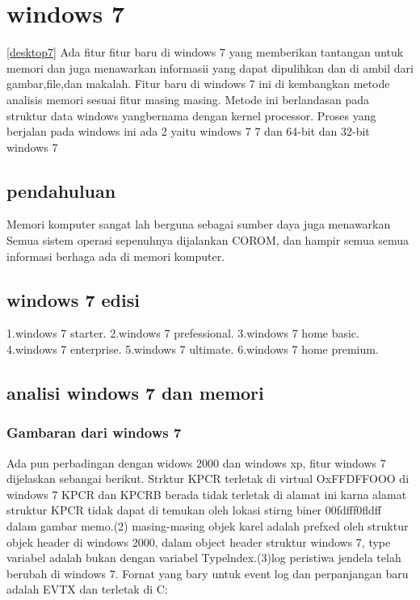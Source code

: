 	\section{windows 7}
\ref{desktop7}
		Ada fitur fitur baru di windows 7 yang memberikan tantangan untuk memori
		dan juga menawarkan informasii yang dapat dipulihkan dan di ambil dari
		gambar,file,dan makalah. Fitur baru di windows 7 ini di kembangkan 
		metode analisis memori sesuai fitur masing masing. Metode ini
		berlandasan pada struktur data windows yangbernama dengan kernel
		processor. Proses yang berjalan pada windows ini ada 2 yaitu windows 7 
		7 dan 64-bit dan 32-bit windows 7
		\subsection{pendahuluan}
			Memori komputer sangat lah berguna sebagai sumber daya juga menawarkan
			Semua sistem operasi sepenuhnya dijalankan COROM, dan hampir semua
			semua informasi berhaga ada di memori komputer.
		\subsection{windows 7 edisi}
			1.windows 7 starter.
			2.windows 7 prefessional.
			3.windows 7 home basic.
			4.windows 7 enterprise.
			5.windows 7 ultimate.
			6.windows 7 home premium.
		\subsection{analisi windows 7 dan memori}
			\subsubsection{Gambaran dari windows 7}
				Ada pun perbadingan dengan widows 2000 dan windows xp, fitur windows 7 
				dijelaskan sebangai berikut. Strktur KPCR terletak di virtual OxFFDFFOOO
				di windows 7 KPCR dan KPCRB berada tidak terletak di alamat ini karna
				alamat struktur KPCR tidak dapat di temukan oleh lokasi stirng biner 
				00fdfff0fldff dalam gambar memo.(2) masing-masing objek karel adalah 
				prefxed oleh struktur objek header di windows 2000, dalam object header
				struktur windows 7, type variabel adalah bukan dengan variabel 
				Typelndex.(3)log peristiwa jendela telah berubah di windows 7. Fornat 
				yang bary untuk event log dan perpanjangan baru adalah \“EVTX\” 
				dan terletak di \“C: \Windows{}\winevvt\Logs\”

